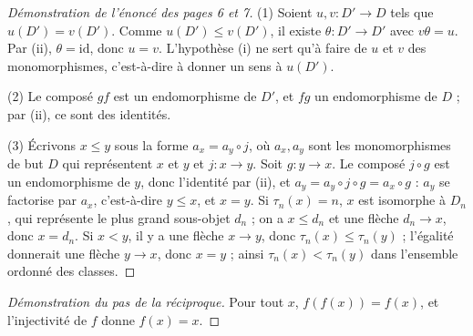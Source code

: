 \begin{proof}[Démonstration de l'énoncé des pages 6 et 7]
(1) Soient $u, v : D' \to D$ tels que $u(D') = v(D')$. Comme $u(D') \leq v(D')$, il existe $\theta : D' \to D'$ avec $v\theta = u$. Par (ii), $\theta = \mathrm{id}$, donc $u = v$. L'hypothèse (i) ne sert qu'à faire de $u$ et $v$ des monomorphismes, c'est-à-dire à donner un sens à $u(D')$.

(2) Le composé $gf$ est un endomorphisme de $D'$, et $fg$ un endomorphisme de $D$ ; par (ii), ce sont des identités.

(3) Écrivons $x \leq y$ sous la forme $a_x = a_y \circ j$, où $a_x, a_y$ sont les monomorphismes de but $D$ qui représentent $x$ et $y$ et $j : x \to y$. Soit $g : y \to x$. Le composé $j \circ g$ est un endomorphisme de $y$, donc l'identité par (ii), et $a_y = a_y \circ j \circ g = a_x \circ g$ : $a_y$ se factorise par $a_x$, c'est-à-dire $y \leq x$, et $x = y$. Si $\tau_n(x) = n$, $x$ est isomorphe à $D_n$, qui représente le plus grand sous-objet $d_n$ ; on a $x \leq d_n$ et une flèche $d_n \to x$, donc $x = d_n$. Si $x < y$, il y a une flèche $x \to y$, donc $\tau_n(x) \leq \tau_n(y)$ ; l'égalité donnerait une flèche $y \to x$, donc $x = y$ ; ainsi $\tau_n(x) < \tau_n(y)$ dans l'ensemble ordonné des classes.
\end{proof}

\begin{proof}[Démonstration du pas de la réciproque]
Pour tout $x$, $f(f(x)) = f(x)$, et l'injectivité de $f$ donne $f(x) = x$.
\end{proof}

